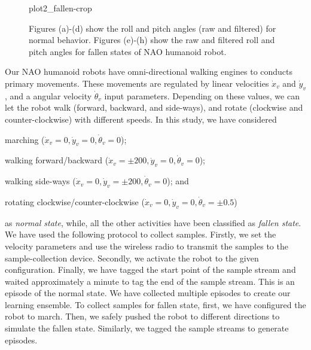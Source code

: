 \documentclass[letterpaper]{article}
\begin{document}
\begin{figure}[!ht]
{       {plot2_fallen-crop}}
  \caption{Figures (a)-(d) show the roll and pitch angles (raw and filtered) for normal 
behavior. Figures (e)-(h) show the raw and filtered roll and pitch angles for fallen 
states of NAO humanoid robot.}
  \label{fig:normalFallenBehavior}

\end{figure}

Our NAO humanoid robots have omni-directional walking engines to conducts primary  
movements. These movements are regulated by linear velocities $\dot{x}_v$ and $\dot{y}_v$, and a 
angular velocity $\dot{\theta}_v$ input parameters. Depending on these
values, we can let the robot walk (forward, backward, and side-ways), and rotate (clockwise and
counter-clockwise) with different speeds. In this study, we have considered \begin{inparaenum}[(1)]
\item marching ($\dot{x}_v = 0 , \dot{y}_v = 0, \dot{\theta}_v = 0$); \item walking  
forward/backward ($\dot{x}_v = \pm200
, \dot{y}_v = 0, \dot{\theta}_v = 0$);  \item walking side-ways ($\dot{x}_v = 0, \dot{y}_v = 
\pm200, \dot{\theta}_v = 0$); and  \item rotating clockwise/counter-clockwise
($\dot{x}_v = 0 , \dot{y}_v = 0, \dot{\theta}_v = \pm 0.5$) \end{inparaenum} as {\em normal state}, 
while, all the other activities have been classified as {\em fallen state}. We have used the  
following protocol to collect samples. Firstly, we set the velocity parameters and use the wireless 
radio to transmit the samples to the sample-collection device. Secondly, we activate the robot to 
the given configuration. Finally, we have tagged the start point of the sample stream and waited 
approximately a minute to tag the end of the sample stream. This is an episode of the normal state. 
We have collected multiple episodes to create our learning ensemble. To collect samples for fallen 
state, first, we have configured the robot to march. Then, we safely pushed the robot to 
different directions to simulate the fallen state. Similarly, we tagged the sample streams to 
generate episodes.    
\end{document}

